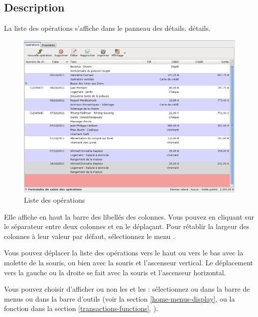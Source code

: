 \subsection{Description\label{transactions-list-description}}

La liste des opérations s'affiche dans le panneau des \ifIllustration détails.
\else détails.
\fi

\ifIllustration 
\begin{figure}[ht]
\begin{center}
\includegraphics[scale=0.5]{image/screenshot/transactions_list}
\end{center}
\caption{Liste des opérations}
\label{transactions-list-img}
\end{figure}
\fi

Elle affiche en haut la barre des libellés des colonnes. Vous pouvez  en cliquant sur le séparateur entre deux colonnes et en le déplaçant. Pour rétablir la largeur des colonnes à leur valeur par défaut, sélectionnez le menu .

Vous pouvez déplacer la liste des opérations vers le haut ou vers le bas avec la molette de la souris, ou bien avec la souris et l'ascenseur vertical. Le déplacement vers la gauche ou la droite se fait avec la souris et l'ascenseur horizontal.

Vous pouvez choisir d'afficher ou non les  et les  : sélectionnez  ou  dans la barre de menus ou dans la barre d'outils (voir la section \vref{home-menus-display},  ou la fonction  dans la section \vref{transactions-functions}, ).

